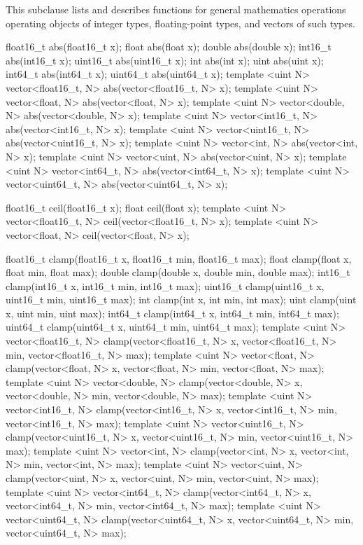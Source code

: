 
\p This subclause lists and describes functions for general mathematics
operations operating objects of integer types, floating-point types, and vectors
of such types.

\begin{HLSL}
float16_t abs(float16_t x);
float abs(float x);
double abs(double x);
int16_t abs(int16_t x);
uint16_t abs(uint16_t x);
int abs(int x);
uint abs(uint x);
int64_t abs(int64_t x);
uint64_t abs(uint64_t x);
template <uint N> vector<float16_t, N> abs(vector<float16_t, N> x);
template <uint N> vector<float, N> abs(vector<float, N> x);
template <uint N> vector<double, N> abs(vector<double, N> x);
template <uint N> vector<int16_t, N> abs(vector<int16_t, N> x);
template <uint N> vector<uint16_t, N> abs(vector<uint16_t, N> x);
template <uint N> vector<int, N> abs(vector<int, N> x);
template <uint N> vector<uint, N> abs(vector<uint, N> x);
template <uint N> vector<int64_t, N> abs(vector<int64_t, N> x);
template <uint N> vector<uint64_t, N> abs(vector<uint64_t, N> x);

float16_t ceil(float16_t x);
float ceil(float x);
template <uint N> vector<float16_t, N> ceil(vector<float16_t, N> x);
template <uint N> vector<float, N> ceil(vector<float, N> x);

float16_t clamp(float16_t x, float16_t min, float16_t max);
float clamp(float x, float min, float max);
double clamp(double x, double min, double max);
int16_t clamp(int16_t x, int16_t min, int16_t max);
uint16_t clamp(uint16_t x, uint16_t min, uint16_t max);
int clamp(int x, int min, int max);
uint clamp(uint x, uint min, uint max);
int64_t clamp(int64_t x, int64_t min, int64_t max);
uint64_t clamp(uint64_t x, uint64_t min, uint64_t max);
template <uint N>
vector<float16_t, N> clamp(vector<float16_t, N> x, vector<float16_t, N> min,
                           vector<float16_t, N> max);
template <uint N>
vector<float, N> clamp(vector<float, N> x, vector<float, N> min,
                       vector<float, N> max);
template <uint N>
vector<double, N> clamp(vector<double, N> x, vector<double, N> min,
                        vector<double, N> max);
template <uint N>
vector<int16_t, N> clamp(vector<int16_t, N> x, vector<int16_t, N> min,
                         vector<int16_t, N> max);
template <uint N>
vector<uint16_t, N> clamp(vector<uint16_t, N> x, vector<uint16_t, N> min,
                          vector<uint16_t, N> max);
template <uint N>
vector<int, N> clamp(vector<int, N> x, vector<int, N> min, vector<int, N> max);
template <uint N>
vector<uint, N> clamp(vector<uint, N> x, vector<uint, N> min,
                      vector<uint, N> max);
template <uint N>
vector<int64_t, N> clamp(vector<int64_t, N> x, vector<int64_t, N> min,
                         vector<int64_t, N> max);
template <uint N>
vector<uint64_t, N> clamp(vector<uint64_t, N> x, vector<uint64_t, N> min,
                          vector<uint64_t, N> max);


\end{HLSL}
